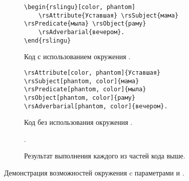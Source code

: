 \begin{figure}[htp!]
    \centering
    \begin{subfigure}{\textwidth}
        \begin{verbatim}
\begin{rslingu}[color, phantom]
    \rsAttribute{Уставшая} \rsSubject{мама} \rsPredicate{мыла} \rsObject{раму}
    \rsAdverbarial{вечером}.
\end{rslingu}
        \end{verbatim}
    \caption{Код с использованием окружения .}
    \end{subfigure}\vspace*{.75cm}
    \begin{subfigure}{\textwidth}
        \begin{verbatim}
\rsAttribute[color, phantom]{Уставшая} \rsSubject[phantom, color]{мама}
\rsPredicate[phantom, color]{мыла} \rsObject[phantom, color]{раму}
\rsAdverbarial[phantom, color]{вечером}.
        \end{verbatim}
    \caption{Код без использования окружения .}
    \end{subfigure}\vspace*{.75cm}
    \begin{subfigure}{.9\textwidth}
        \centering
        \begin{rslingu}
                .
        \end{rslingu}
    \caption{Результат выполнения каждого из частей кода выше.}
    \end{subfigure}
    \caption{Демонстрация возможностей окружения  c параметрами  и .}
\end{figure}
